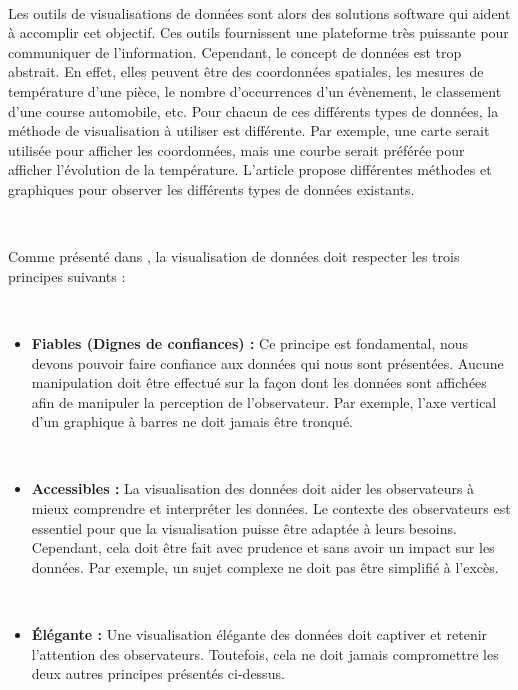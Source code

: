 ~

\noindent
Les outils de visualisations de données sont alors des solutions software qui aident à accomplir cet objectif. \cite{bikakis2018big} Ces outils fournissent une plateforme très puissante pour communiquer de l'information. Cependant, le concept de données est trop abstrait. En effet, elles peuvent être des coordonnées spatiales, les mesures de température d'une pièce, le nombre d'occurrences d'un évènement, le classement d'une course automobile, etc. Pour chacun de ces différents types de données, la méthode de visualisation à utiliser est différente. Par exemple, une carte serait utilisée pour afficher les coordonnées, mais une courbe serait préférée pour afficher l'évolution de la température. L'article \cite{zoo_data} propose différentes méthodes et graphiques pour observer les différents types de données existants.

~

\noindent
Comme présenté dans \cite{kirk2019data}, la visualisation de données doit respecter les trois principes suivants :

~

\begin{itemize}
  \item \textbf{Fiables (Dignes de confiances) :} Ce principe est fondamental, nous devons pouvoir faire confiance aux données qui nous sont présentées. Aucune manipulation doit être effectué sur la façon dont les données sont affichées afin de manipuler la perception de l'observateur. Par exemple, l'axe vertical d'un graphique à barres ne doit jamais être tronqué.

  ~

  \item \textbf{Accessibles :} La visualisation des données doit aider les observateurs à mieux comprendre et interpréter les données. Le contexte des observateurs est essentiel pour que la visualisation puisse être adaptée à leurs besoins. Cependant, cela doit être fait avec prudence et sans avoir un impact sur les données. Par exemple, un sujet complexe ne doit pas être simplifié à l'excès.

  ~

  \item \textbf{Élégante :} Une visualisation élégante des données doit captiver et retenir l'attention des observateurs. Toutefois, cela ne doit jamais compromettre les deux autres principes présentés ci-dessus.


\end{itemize}


